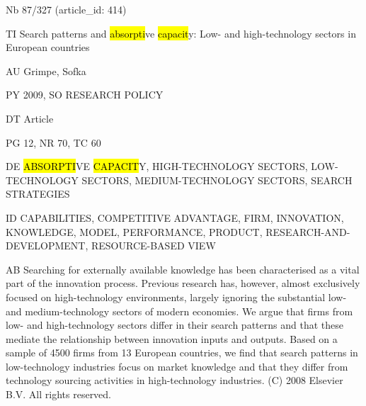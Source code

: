 \documentclass[a4paper]{article}
\begin{document}
\vspace*{-2cm}
Nb \tabto{0cm}87/327 (article\_id: 414)\par
TI \tabto{0cm}Search patterns and \hl{absorpti}ve \hl{capacit}y: Low- and high-technology sectors in European countries\par
AU \tabto{0cm}Grimpe, Sofka\par
PY \tabto{0cm}2009, SO RESEARCH POLICY\par
DT \tabto{0cm}Article\par
PG \tabto{0cm}12, NR 70, TC 60\par
DE \tabto{0cm}\hl{ABSORPTI}VE \hl{CAPACIT}Y, HIGH-TECHNOLOGY SECTORS, LOW-TECHNOLOGY SECTORS, MEDIUM-TECHNOLOGY SECTORS, SEARCH STRATEGIES\par
ID \tabto{0cm}CAPABILITIES, COMPETITIVE ADVANTAGE, FIRM, INNOVATION, KNOWLEDGE, MODEL, PERFORMANCE, PRODUCT, RESEARCH-AND-DEVELOPMENT, RESOURCE-BASED VIEW\par
AB \tabto{0cm}Searching for externally available knowledge has been characterised as a vital part of the innovation process. Previous research has, however, almost exclusively focused on high-technology environments, largely ignoring the substantial low- and medium-technology sectors of modern economies. We argue that firms from low- and high-technology sectors differ in their search patterns and that these mediate the relationship between innovation inputs and outputs. Based on a sample of 4500 firms from 13 European countries, we find that search patterns in low-technology industries focus on market knowledge and that they differ from technology sourcing activities in high-technology industries. (C) 2008 Elsevier B.V. All rights reserved.\par
\clearpage
\end{document}
